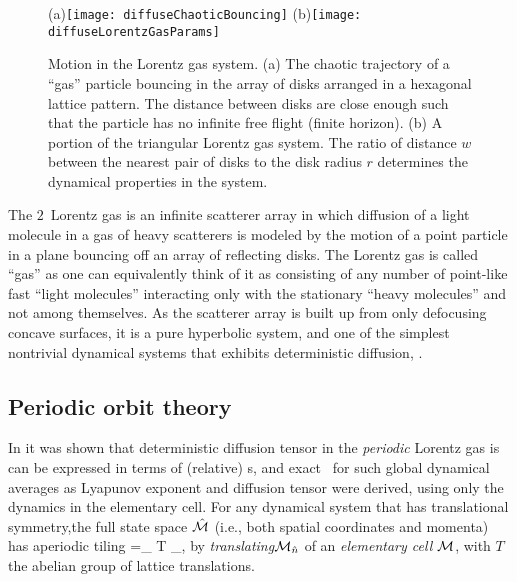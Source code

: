 \documentclass[aps,pre,
                showpacs,
                twocolumn,
                groupedaddress,
                floatfix]{revtex4-1}
\begin{document}
\begin{figure}[htbp]
  \begin{center}
    (a)\texttt{[image: diffuseChaoticBouncing]}
    (b)\texttt{[image: diffuseLorentzGasParams]}
  \end{center}
  \caption[]{\label{fig-chaoticBouncing} Motion in the Lorentz gas system. (a)  The chaotic trajectory of a ``gas'' particle bouncing in the array of disks  arranged in a hexagonal lattice pattern. The distance between disks are close  enough such that the particle has no infinite free flight (finite horizon).  (b) A portion of the triangular Lorentz gas    system. The ratio of distance $w$ between the nearest pair of disks to the    disk radius $r$ determines the dynamical properties in the system. }
\end{figure}

The $2$\dmn\ Lorentz gas is an infinite scatterer array in which diffusion of a 
light molecule in a gas of heavy scatterers is modeled by the motion of a point 
particle in a plane bouncing off an array of reflecting disks. The Lorentz gas 
is called ``gas'' as one can equivalently think of it as consisting of any 
number of point-like fast ``light molecules'' interacting only with the 
stationary ``heavy molecules'' and not among themselves.  As the scatterer 
array is built up from only defocusing concave surfaces, it is a pure 
hyperbolic system, and one of the simplest nontrivial dynamical systems that 
exhibits deterministic diffusion, .


\subsection{Periodic orbit theory}

In  it was shown that deterministic diffusion tensor in the {\em periodic} Lorentz gas is can be expressed in terms of (relative) \po s, and exact \cycForm\ for such global dynamical averages as Lyapunov exponent and diffusion tensor were derived, using only the dynamics in the elementary cell. For any dynamical system that has translational symmetry,the full state space $\hat {{\cal M}}$ (i.e., both spatial coordinates and momenta) has aperiodic tiling 
\beq
\hM=\bigcup_{ \hn \in T} \pS_{\hn},
\eeq 
by {\em translating}${\cal M}_{\hat n}$ of an {\em elementary cell} ${\cal M}$, with $T$ the abelian group of lattice translations.
\end{document}
